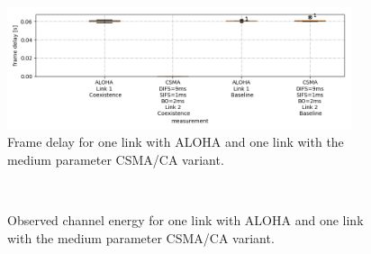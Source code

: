 \begin{figure}[tb]
	\label{fig:results-aloha-csma-frame-delay}
	\begin{center}
		\includegraphics[width=0.9\textwidth]{pictures/results/different_combinations/aloha_csma/frame_delay_boxplot}
	\end{center}
	\caption{Frame delay for one link with ALOHA and one link with the medium parameter CSMA/CA variant.}
\end{figure}

\begin{figure}[tb]
	\label{fig:results-aloha-csma-channel-meta}
	\begin{center}
		\\
	\end{center}
	\caption{Observed channel energy for one link with ALOHA and one link with the medium parameter CSMA/CA variant.}
\end{figure}

